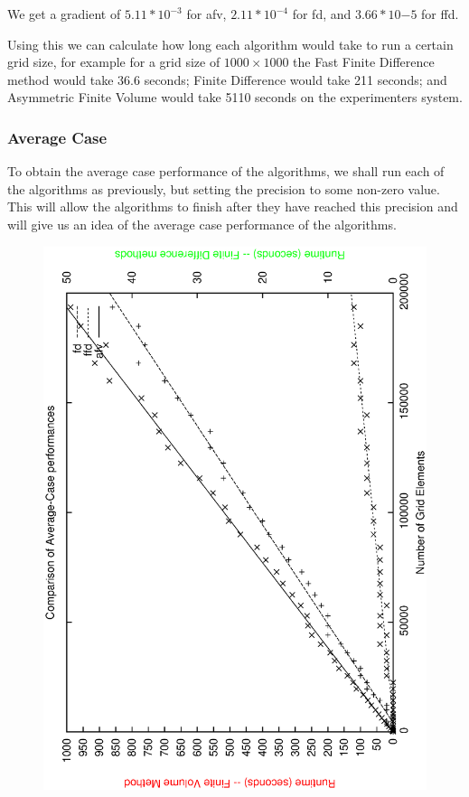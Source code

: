 \documentclass[aps,twocolumn,pre,nofootinbib,10pt]{revtex4-1}
\begin{document}
We get a gradient of $5.11*10^{-3}$ for afv, $2.11*10^{-4}$ for fd, and $3.66*10{-5}$ for ffd.

Using this we can calculate how long each algorithm would take to run a certain grid size, for example for a grid size of $1000 \times 1000$ the Fast Finite Difference method would take 36.6 seconds; Finite Difference would take 211 seconds; and Asymmetric Finite Volume would take 5110 seconds on the experimenters system.

\subsubsection{Average Case}

To obtain the average case performance of the algorithms, we shall run each of the algorithms as previously, but setting the precision to some non-zero value. This will allow the algorithms to finish after they have reached this precision and will give us an idea of the average case performance of the algorithms.

\begin{figure}
    \begin{center}
        \includegraphics*[angle=-90,width=\columnwidth]{comparison_ac.ps}
    \end{center}
\end{figure}
\end{document}
